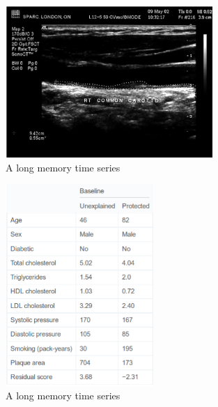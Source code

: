\begin{figure}[h]
\begin{center}
\includegraphics[width=0.7\textwidth]{plaque_area.png}
\caption{A long memory time series\label{ts1}}
\end{center}
\end{figure}

\begin{figure}[h]
\begin{center}
\includegraphics[width=0.5\textwidth]{risk_factors.png}
\caption{A long memory time series\label{ts1}}
\end{center}
\end{figure}


